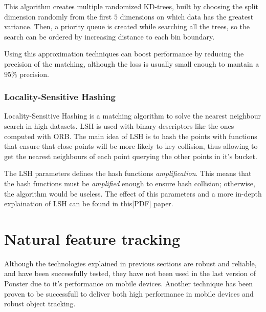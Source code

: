 This algorithm creates multiple randomized KD-trees, built by choosing the
split dimension randomly from the first $5$ dimensions on which data has the
greatest variance. Then, a priority queue is created while searching all the
trees, so the search can be ordered by increasing distance to each bin
boundary. 

Using this approximation techniques can boost performance by reducing the
precision of the matching, although the loss is usually small enough to mantain
a $95\%$ precision. 

\subsubsection{Locality-Sensitive Hashing}
Locality-Sensitive Hashing is a matching algorithm to solve the nearest
neighbour search in high datasets. LSH is used with binary descriptors like the
ones computed with ORB. The main idea of LSH is to hash the points with
functions that ensure that close points will be more likely to key collision,
thus allowing to get the nearest neighbours of each point querying the other
points in it's bucket\cite{Andoni:2008:NHA:1327452.1327494}.

The LSH parameters defines the hash functions \emph{amplification}. This means that
the hash functions must be \emph{amplified} enough to ensure hash collision;
otherwise, the algorithm would be useless. The effect of this parameters and a more
in-depth explaination of LSH can be found in this[PDF] paper.

\section{Natural feature tracking}
Although the technologies explained in previous sections are robust and reliable,
and have been successfully tested, they have not been used in the last version of
Ponster due to it's performance on mobile devices. Another technique has been proven
to be successfull to deliver both high performance in mobile devices and robust
object tracking.

